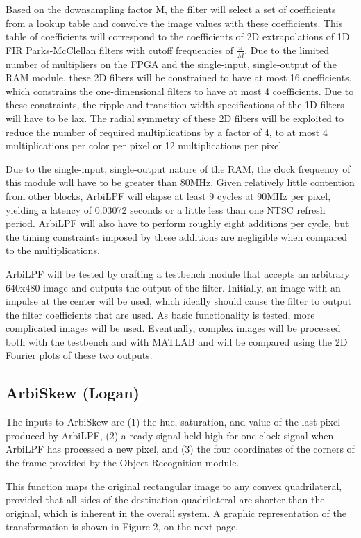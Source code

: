 \documentclass[10pt]{article}
\begin{document}
Based on the downsampling factor M, the filter will select a set of coefficients from a lookup table and convolve the image values with these coefficients. This table of coefficients will correspond to the coefficients of 2D extrapolations of 1D FIR Parks-McClellan filters with cutoff frequencies of \( \frac{\pi}{M} \). Due to the limited number of multipliers on the FPGA and the single-input, single-output of the RAM module, these 2D filters will be constrained to have at most 16 coefficients, which constrains the one-dimensional filters to have at most 4 coefficients. Due to these constraints, the ripple and transition width specifications of the 1D filters will have to be lax. The radial symmetry of these 2D filters will be exploited to reduce the number of required multiplications by a factor of 4, to at most 4 multiplications per color per pixel or 12 multiplications per pixel.

Due to the single-input, single-output nature of the RAM, the clock frequency of this module will have to be greater than 80MHz. Given relatively little contention from other blocks, ArbiLPF will elapse at least 9 cycles at 90MHz per pixel, yielding a latency of 0.03072 seconds or a little less than one NTSC refresh period. ArbiLPF will also have to perform roughly eight additions per cycle, but the timing constraints imposed by these additions are negligible when compared to the multiplications.

ArbiLPF will be tested by crafting a testbench module that accepts an arbitrary 640x480 image and outputs the output of the filter. Initially, an image with an impulse at the center will be used, which ideally should cause the filter to output the filter coefficients that are used. As basic functionality is tested, more complicated images will be used. Eventually, complex images will be processed both with the testbench and with MATLAB and will be compared using the 2D Fourier plots of these two outputs.

\subsection{ArbiSkew (Logan)}
The inputs to ArbiSkew are (1) the hue, saturation, and value of the last pixel produced by ArbiLPF, (2) a ready signal held high for one clock signal when ArbiLPF has processed a new pixel, and (3) the four coordinates of the corners of the frame provided by the Object Recognition module.

This function maps the original rectangular image to any convex quadrilateral, provided that all sides of the destination quadrilateral are shorter than the original, which is inherent in the overall system. A graphic representation of the transformation is shown in Figure 2, on the next page.
\end{document}
